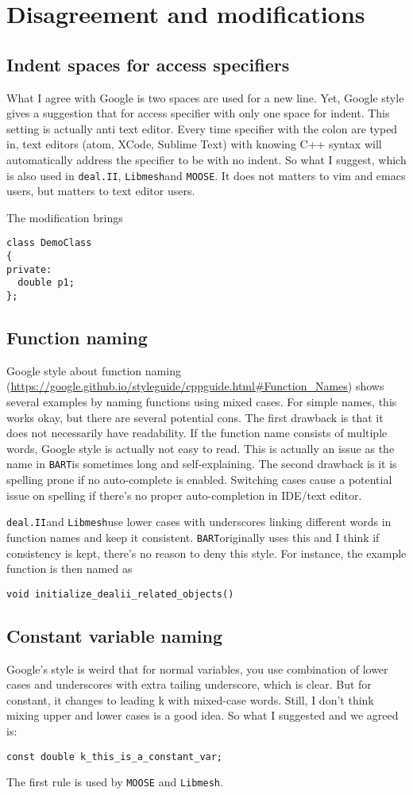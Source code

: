 \documentclass{article}
\newcommand{\bart}{{\tt BART}}
\newcommand{\libmesh}{{\tt Libmesh}}
\newcommand{\dealii}{{\tt deal.II}}
\newcommand{\moose}{{\tt MOOSE}}
\begin{document}
\section{Disagreement and modifications}
\subsection{Indent spaces for access specifiers}
What I agree with Google is two spaces are used for a new line. Yet, Google style gives a suggestion that for access specifier with only one space for indent. This setting is actually anti text editor. Every time specifier with the colon are typed in, text editors (atom, XCode, Sublime Text) with knowing C++ syntax will automatically address the specifier to be with no indent. So what I suggest, which is also used in \dealii, \libmesh and \moose. It does not matters to vim and emacs users, but matters to text editor users.

The modification brings
\begin{lstlisting}
class DemoClass
{
private:
  double p1;
};
\end{lstlisting}
\subsection{Function naming}
Google style about function naming (\url{https://google.github.io/styleguide/cppguide.html#Function_Names}) shows several examples by naming functions using mixed cases. For simple names, this works okay, but there are several potential cons.
The first drawback is that it does not necessarily have readability. If the function name consists of multiple words, Google style is actually not easy to read. This is actually an issue as the name in \bart is sometimes long and self-explaining. The second drawback is it is spelling prone if no auto-complete is enabled. Switching cases cause a potential issue on spelling if there's no proper auto-completion in IDE/text editor.

\dealii and \libmesh use lower cases with underscores linking different words in function names and keep it consistent. \bart originally uses this and I think if consistency is kept, there's no reason to deny this style. For instance, the example function is then named as
\begin{lstlisting}
void initialize_dealii_related_objects()
\end{lstlisting}
\subsection{Constant variable naming}
Google's style is weird that for normal variables, you use combination of lower cases and underscores with extra tailing underscore, which is clear. But for constant, it changes to leading k with mixed-case words. Still, I don't think mixing upper and lower cases is a good idea. So what I suggested and we agreed is:
\begin{lstlisting}
const double k_this_is_a_constant_var;
\end{lstlisting}
The first rule is used by {\tt MOOSE} and \libmesh.
\end{document}
